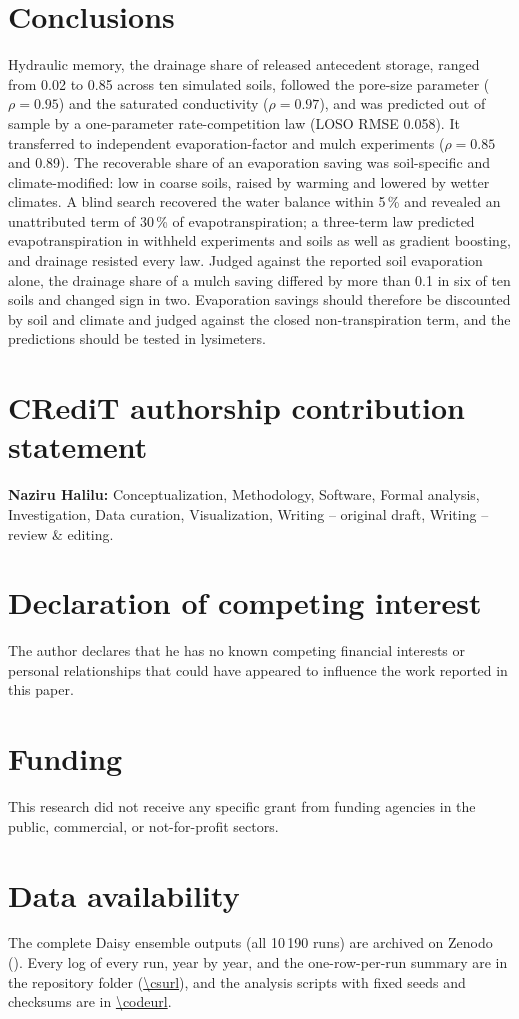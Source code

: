 \documentclass[review,12pt,authoryear]{elsarticle}
\begin{document}
\section{Conclusions}
Hydraulic memory, the drainage share of released antecedent storage, ranged from 0.02 to 0.85 across ten simulated soils, followed the pore-size parameter ($\rho=0.95$) and the saturated conductivity ($\rho=0.97$), and was predicted out of sample by a one-parameter rate-competition law (LOSO RMSE 0.058). It transferred to independent evaporation-factor and mulch experiments ($\rho=0.85$ and 0.89). The recoverable share of an evaporation saving was soil-specific and climate-modified: low in coarse soils, raised by warming and lowered by wetter climates. A blind search recovered the water balance within 5\,\% and revealed an unattributed term of 30\,\% of evapotranspiration; a three-term law predicted evapotranspiration in withheld experiments and soils as well as gradient boosting, and drainage resisted every law. Judged against the reported soil evaporation alone, the drainage share of a mulch saving differed by more than 0.1 in six of ten soils and changed sign in two. Evaporation savings should therefore be discounted by soil and climate and judged against the closed non-transpiration term, and the predictions should be tested in lysimeters.

\section*{CRediT authorship contribution statement}
\textbf{Naziru Halilu:} Conceptualization, Methodology, Software, Formal analysis, Investigation, Data curation, Visualization, Writing -- original draft, Writing -- review \& editing.

\section*{Declaration of competing interest}
The author declares that he has no known competing financial interests or personal relationships that could have appeared to influence the work reported in this paper.

\section*{Funding}
This research did not receive any specific grant from funding agencies in the public, commercial, or not-for-profit sectors.

\section*{Data availability}
The complete Daisy ensemble outputs (all 10\,190 runs) are archived on Zenodo (). Every log of every run, year by year, and the one-row-per-run summary are in the repository folder \cslink{} (\url{\csurl}), and the analysis scripts with fixed seeds and checksums are in \url{\codeurl}.
\end{document}
